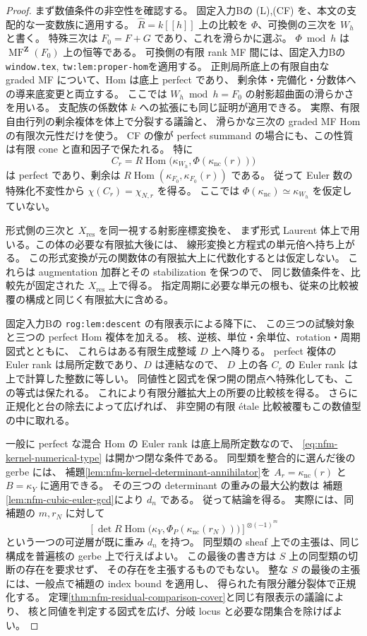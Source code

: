 \begin{proof}
まず数値条件の非空性を確認する。
固定入力Bの (L),(CF) を、本文の支配的な一変数族に適用する。
$\widehat R=k[[h]]$ 上の比較を $\Phi$、可換側の三次を $W_h$ と書く。
特殊三次は $F_0=F+G$ であり、これを滑らかに選ぶ。
$\Phi\bmod h$ は $\operatorname{MF}^{\mathbf Z}(F_0)$ 上の恒等である。
可換側の有限 rank MF 間には、固定入力Bの
\texttt{window.tex}, \texttt{tw:lem:proper-hom}を適用する。
正則局所底上の有限自由な graded MF について、Hom は底上 perfect であり、
剰余体・完備化・分数体への導来底変更と両立する。
ここでは $W_h\bmod h=F_0$ の射影超曲面の滑らかさを用いる。
支配族の係数体 $k$ への拡張にも同じ証明が適用できる。
実際、有限自由行列の剰余複体を体上で分裂する議論と、
滑らかな三次の graded MF Hom の有限次元性だけを使う。
CF の像が perfect summand の場合にも、この性質は有限 cone と直和因子で保たれる。
特に
\[
 C_r=R\operatorname{Hom}
       \bigl(\kappa_{W_h},\Phi(\kappa_{\mathrm{nc}}(r))\bigr)
\]
は perfect であり、剰余は
$R\operatorname{Hom}(\kappa_{F_0},\kappa_{F_0}(r))$ である。
従って Euler 数の特殊化不変性から
$\chi(C_r)=\chi_{N,r}$ を得る。
ここでは $\Phi(\kappa_{\mathrm{nc}})\simeq\kappa_{W_h}$ を仮定していない。

形式側の三次と $X_{\mathrm{res}}$ を同一視する射影座標変換を、
まず形式 Laurent 体上で用いる。この体の必要な有限拡大後には、
線形変換と方程式の単元倍へ持ち上がる。
この形式変換が元の関数体の有限拡大上に代数化するとは仮定しない。
これらは augmentation 加群とその stabilization を保つので、
同じ数値条件を、比較先が固定された $X_{\mathrm{res}}$ 上で得る。
指定周期に必要な単元の根も、従来の比較被覆の構成と同じく有限拡大に含める。

固定入力Bの \texttt{rog:lem:descent} の有限表示による降下に、
この三つの試験対象と三つの perfect Hom 複体を加える。
核、逆核、単位・余単位、rotation・周期図式とともに、
これらはある有限生成整域 $D$ 上へ降りる。
perfect 複体の Euler rank は局所定数であり、$D$ は連結なので、
$D$ 上の各 $C_r$ の Euler rank は上で計算した整数に等しい。
同値性と図式を保つ開の閉点へ特殊化しても、この等式は保たれる。
これにより有限分離拡大上の所要の比較核を得る。
さらに正規化と台の除去によって広げれば、
非空開の有限 étale 比較被覆もこの数値型の中に取れる。

一般に perfect な混合 Hom の Euler rank は底上局所定数なので、
\eqref{eq:nfm-kernel-numerical-type} は開かつ閉な条件である。
同型類を整合的に選んだ後の gerbe には、
補題\ref{lem:nfm-kernel-determinant-annihilator}を
$A_r=\kappa_{\mathrm{nc}}(r)$ と $B=\kappa_Y$ に適用できる。
その三つの determinant の重みの最大公約数は
補題\ref{lem:nfm-cubic-euler-gcd}により $d_n$ である。
従って結論を得る。
実際には、同補題の $m,r_N$ に対して
\[
 \left[\det R\operatorname{Hom}
   \bigl(\kappa_Y,\Phi_P(\kappa_{\mathrm{nc}}(r_N))\bigr)\right]^{\otimes(-1)^m}
\]
という一つの可逆層が既に重み $d_n$ を持つ。
同型類の sheaf 上での主張は、同じ構成を普遍核の gerbe 上で行えばよい。
この最後の書き方は $S$ 上の同型類の切断の存在を要求せず、
その存在を主張するものでもない。
整な $S$ の最後の主張には、一般点で補題の index bound を適用し、
得られた有限分離分裂体で正規化する。
定理\ref{thm:nfm-residual-comparison-cover}と同じ有限表示の議論により、
核と同値を判定する図式を広げ、分岐 locus と必要な閉集合を除けばよい。
\end{proof}

